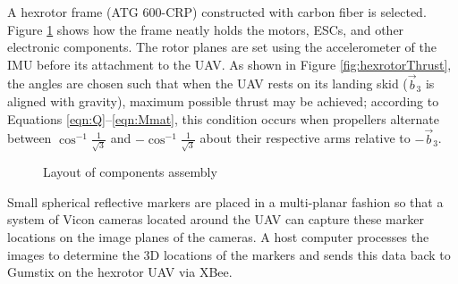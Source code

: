 \documentclass[twocolumn,letterpaper]{IEEEAerospaceCLS}  %
\begin{document}
A hexrotor frame (ATG 600-CRP) constructed with carbon fiber is selected. Figure \ref{Frame} shows how the frame neatly holds the motors, ESCs, and other electronic components. The rotor planes are set using the accelerometer of the IMU before its attachment to the UAV. As shown in Figure \ref{fig:hexrotorThrust}, the angles are chosen such that when the UAV rests on its landing skid ($\vec b_3$ is aligned with gravity), maximum possible thrust may be achieved; according to Equations \ref{eqn:Q}--\ref{eqn:Mmat}, this condition occurs when propellers alternate between $\cos^{-1}{\frac{1}{\sqrt3}}$ and $-\cos^{-1}{\frac{1}{\sqrt3}}$ about their respective arms relative to $-\vec b_3$.

\begin{figure}
\centerline{
	\hfill
	}
\caption{Layout of components assembly}
\label{Frame}
\end{figure}

Small spherical reflective markers are placed in a multi-planar fashion so that a system of Vicon cameras located around the UAV can capture these marker locations on the image planes of the cameras. A host computer processes the images to determine the 3D locations of the markers and sends this data back to Gumstix on the hexrotor UAV via XBee.

		
\end{document}

